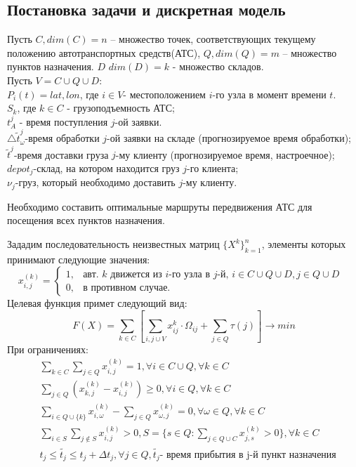 \documentclass[]{TAACpaper}
\begin{document}
\subsection{Постановка задачи и дискретная модель}
Пусть $C,dim(C)=n$ – множество точек, соответствующих текущему положению автотранспортных средств(АТС), $Q,dim(Q)=m$ – множество пунктов назначения. $D$ $dim(D)=k$ - множество складов.\\
Пусть $V=C\cup{Q}\cup{D}$:\\
$P_i(t)={lat,lon}$, где $i\in{V}$- местоположением $i$-го узла в момент времени $t$.\\
$S_k$, где $k\in{C}$ - грузоподъемность АТС;\\
$t_{A}^{j}$ - время поступления $j$-ой заявки.\\
$\bigtriangleup\tilde{t}_{\omega}^{j}$-время обработки $j$-ой заявки на складе (прогнозируемое время обработки);\\
$\tilde{t}^{j}$-время доставки груза $j$-му клиенту (прогнозируемое время, настроечное);\\
$depot_j$-склад, на котором находится груз $j$-го клиента;\\
$\nu_j$-груз, который необходимо доставить $j$-му клиенту.

Необходимо составить оптимальные маршруты передвижения АТС для посещения всех пунктов назначения.

Зададим последовательность неизвестных матриц $\{X^k\}^n_{k=1}$, элементы  которых принимают следующие значения:
\begin{equation}
  x^{(k)}_{i,j} = 
    \begin{cases}
	  1,&\text{авт. $k$ движется из $i$-го узла в $j$-й, 
	           $i\in{C}\cup{Q}\cup{D}, j \in Q\cup{D}$ }\\
	  0,&\text{в противном случае.}
    \end{cases}
\end{equation}
Целевая функция примет следующий вид:
\begin{equation} \label{main_objective}
  F(X) = 
    \sum_{k \in C}[
     \sum_{i,j\cup{V}} 
     x_{ij}^{k}\cdot\Omega_{ij}+\sum_{j\in{Q}}\tau(j)
     ]
     \to min
\end{equation}
При ограничениях:
\begin{align} 
& \sum_{k \in C}\sum_{j \in Q}x^{(k)}_{i,j} = 1, 
  \forall i \in C \cup Q, \forall k \in C \label{main_cond_1}\\ 
& \sum_{j \in Q} ( 
       x^{(k)}_{k,j} -x^{(k)}_{i,j} ) \geq 0, 
       \forall i \in Q ,  \forall k \in C \label{main_cond_2}\\
& \sum_{i \in Q \cup  \{k\}} x^{(k)}_{i,\omega} - 
  \sum_{j \in Q} x^{(k)}_{\omega,j} = 0, 
  \forall \omega \in Q ,  \forall k \in C \label{main_cond_3}\\
&  \sum_{i \in S}\sum_{j \notin S}x^{(k)}_{i,j} > 0, 
  S=\{s \in Q: \sum_{j \in Q \cup C}x^{(k)}_{j,s}>0 \}  ,\forall k \in C \label{main_cond_4}\\
& t_j \leq \tilde{t_j} \leq t_j + \Delta t_j, \forall j \in Q, 
\tilde{t_j} \text {- время прибытия в j-й пункт назначения} \label{main_cond_5}
\end{align}
\end{document}
